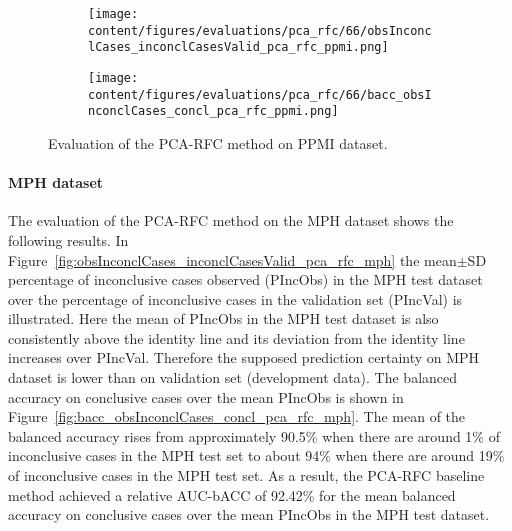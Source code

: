 \begin{figure}[ht]
  \begin{subfigure}{0.49\textwidth}
    \centering
    \texttt{[image: content/figures/evaluations/pca\_rfc/66/obsInconclCases\_inconclCasesValid\_pca\_rfc\_ppmi.png]}
    \label{fig:obsInconclCases_inconclCasesValid_pca_rfc_ppmi}
  \end{subfigure}
  \hfill
  \begin{subfigure}{0.49\textwidth}
    \centering
    \texttt{[image: content/figures/evaluations/pca\_rfc/66/bacc\_obsInconclCases\_concl\_pca\_rfc\_ppmi.png]}
    \label{fig:bacc_obsInconclCases_concl_pca_rfc_ppmi}
  \end{subfigure}
  \caption{Evaluation of the PCA-RFC method on PPMI dataset.}
  \label{fig:perf_results_rfc_ppmi}
\end{figure}




\paragraph{MPH dataset}

The evaluation of the PCA-RFC method on the MPH dataset shows the following results.
In Figure~\ref{fig:obsInconclCases_inconclCasesValid_pca_rfc_mph} 
the mean$\pm$SD percentage of inconclusive cases observed (PIncObs) in the MPH test dataset 
over the percentage of inconclusive cases in the validation set (PIncVal) is illustrated.
Here the mean of PIncObs in the MPH test dataset
is also consistently above the identity line and its deviation from the identity line increases over PIncVal.
Therefore the supposed prediction certainty on MPH dataset is lower than on validation set (development data).
The balanced accuracy on conclusive cases over the mean PIncObs is shown 
in Figure~\ref{fig:bacc_obsInconclCases_concl_pca_rfc_mph}.
The mean of the balanced accuracy rises from approximately 90.5\% 
when there are around 1\% of inconclusive cases in the MPH test set to about 94\% 
when there are around 19\% of inconclusive cases in the MPH test set.
As a result, the PCA-RFC baseline method achieved a relative AUC-bACC of 92.42\% for the mean balanced accuracy on conclusive cases 
over the mean PIncObs in the MPH test dataset.


